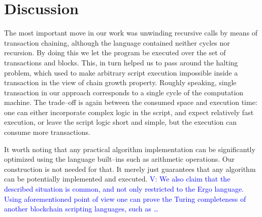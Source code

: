 \documentclass[runningheads]{llncs}
\newcommand{\vk}[1]{\textcolor{blue}{V: {#1}}}
\begin{document}
    \section{Discussion}
    The most important move in our work was unwinding recursive calls by means
    of transaction chaining, although the language contained neither cycles nor
    recursion. By doing this we let the program be executed over the set of
    transactions and blocks. This, in turn helped us to pass around the halting
    problem, which used to make arbitrary script execution impossible inside a
    transaction in the view of chain growth property. Roughly speaking, single
    transaction in our approach corresponds to a single cycle of the computation
    machine. The trade--off is again between the consumed space and execution time:
    one can either incorporate complex logic in the script, and expect
    relatively fast execution, or leave the script logic short and simple, but
    the execution can consume more transactions.

    It worth noting that any practical algorithm implementation can be
    significantly optimized using the language built--ins such as arithmetic
    operations. Our construction is not needed for that. It merely just
    guarantees that any algorithm can be potentially implemented and executed.
    \vk{We also claim that the described situation is common, and not only
        restricted to the Ergo language. Using aforementioned point of view one
        can prove the Turing completeness of another blockchain scripting
    languages, such as \ldots}
\end{document}
